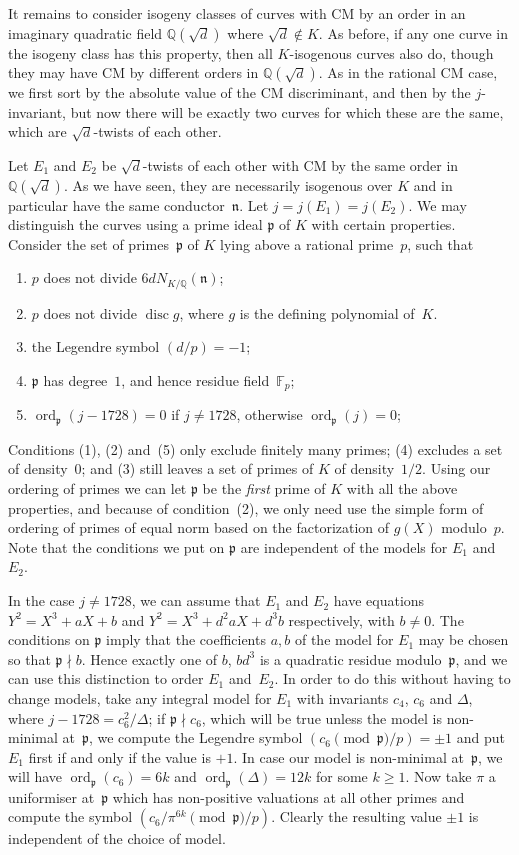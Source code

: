 \documentclass{article}
\def\Q{{\mathbb Q}}
\def\F{{\mathbb F}}
\def\n{{\mathfrak n}}
\def\p{{\mathfrak p}}
\DeclareMathOperator{\disc}{disc}
\DeclareMathOperator{\ord}{ord}
\begin{document}
It remains to consider isogeny classes of curves with CM by an order
in an imaginary quadratic field $\Q(\sqrt{d})$ where $\sqrt{d}\notin
K$.  As before, if any one curve in the isogeny class has this
property, then all $K$-isogenous curves also do, though they may have
CM by different orders in $\Q(\sqrt{d})$.  As in the rational CM case,
we first sort by the absolute value of the CM discriminant, and then
by the $j$-invariant, but now there will be exactly two curves for
which these are the same, which are $\sqrt{d}$-twists of each other.

Let $E_1$ and $E_2$ be $\sqrt{d}$-twists of each other with CM by the
same order in $\Q(\sqrt{d})$.  As we have seen, they are necessarily
isogenous over $K$ and in particular have the same conductor~$\n$.
Let $j=j(E_1)=j(E_2)$.  We may distinguish the curves using a prime
ideal $\p$ of $K$ with certain properties.  Consider the set of
primes~$\p$ of $K$ lying above a rational prime~$p$, such that
\begin{enumerate}
\item $p$ does not divide $6dN_{K/\Q}(\n)$;
\item $p$ does not divide $\disc g$, where $g$ is the defining polynomial
  of~$K$.
\item the Legendre symbol $(d/p)=-1$;
\item $\p$ has degree~$1$, and hence residue field~$\F_p$;
\item $\ord_{\p}(j-1728)=0$ if $j\not=1728$, otherwise $\ord_{\p}(j)=0$;
\end{enumerate}
Conditions (1), (2) and~(5) only exclude finitely many primes; (4)
excludes a set of density~$0$; and (3) still leaves a set of primes of
$K$ of density~$1/2$.  Using our ordering of primes we can let $\p$ be
the \textit{first} prime of $K$ with all the above properties, and
because of condition~(2), we only need use the simple form of ordering
of primes of equal norm based on the factorization of $g(X)$
modulo~$p$.  Note that the conditions we put on $\p$ are independent
of the models for $E_1$ and~$E_2$.

In the case $j\not=1728$, we can assume that $E_1$ and $E_2$ have
equations $Y^2=X^3+aX+b$ and $Y^2=X^3+d^2aX+d^3b$ respectively, with
$b\not=0$.  The conditions on $\p$ imply that the coefficients $a,b$
of the model for $E_1$ may be chosen so that $\p\nmid b$.  Hence
exactly one of $b$, $bd^3$ is a quadratic residue modulo~$\p$, and we
can use this distinction to order $E_1$ and~$E_2$.  In order to do
this without having to change models, take any integral model for
$E_1$ with invariants $c_4$, $c_6$ and $\Delta$, where
$j-1728=c_6^2/\Delta$; if $\p\nmid c_6$, which will be true unless the
model is non-minimal at~$\p$, we compute the Legendre symbol
$(c_6\pmod{\p}/p)=\pm1$ and put $E_1$ first if and only if the value
is $+1$.  In case our model is non-minimal at~$\p$, we will have
$\ord_{\p}(c_6)=6k$ and $\ord_{\p}(\Delta)=12k$ for some $k\ge1$.  Now
take $\pi$ a uniformiser at~$\p$ which has non-positive valuations at
all other primes and compute the symbol $(c_6/\pi^{6k}\pmod{\p}/p)$.
Clearly the resulting value $\pm1$ is independent of the choice of
model.
\end{document}
